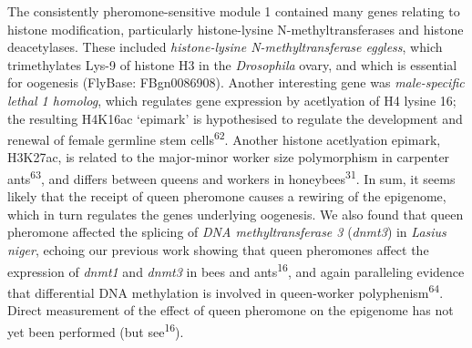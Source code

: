 \documentclass[12pt,]{article}
\begin{document}
The consistently pheromone-sensitive module 1 contained many genes
relating to histone modification, particularly histone-lysine
N-methyltransferases and histone deacetylases. These included
\emph{histone-lysine N-methyltransferase eggless}, which trimethylates
Lys-9 of histone H3 in the \emph{Drosophila} ovary, and which is
essential for oogenesis (FlyBase: FBgn0086908). Another interesting gene
was \emph{male-specific lethal 1 homolog}, which regulates gene
expression by acetlyation of H4 lysine 16; the resulting H4K16ac
`epimark' is hypothesised to regulate the development and renewal of
female germline stem cells\textsuperscript{62}. Another histone
acetlyation epimark, H3K27ac, is related to the major-minor worker size
polymorphism in carpenter ants\textsuperscript{63}, and differs between
queens and workers in honeybees\textsuperscript{31}. In sum, it seems
likely that the receipt of queen pheromone causes a rewiring of the
epigenome, which in turn regulates the genes underlying oogenesis. We
also found that queen pheromone affected the splicing of \emph{DNA
methyltransferase 3} (\emph{dnmt3}) in \emph{Lasius niger}, echoing our
previous work showing that queen pheromones affect the expression of
\emph{dnmt1} and \emph{dnmt3} in bees and ants\textsuperscript{16}, and
again paralleling evidence that differential DNA methylation is involved
in queen-worker polyphenism\textsuperscript{64}. Direct measurement of
the effect of queen pheromone on the epigenome has not yet been
performed (but see\textsuperscript{16}).
\end{document}
